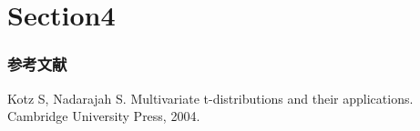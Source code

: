 \documentclass[dvipdfmx,11pt]{beamer}
\begin{document}
\section{Section4}
\begin{frame}[t,allowframebreaks]\frametitle{参考文献}
    \scriptsize{%
    \begin{thebibliography}{99}
    \setlength{\itemsep}{-.5zw}
    \beamertemplatetextbibitems
     Kotz S, Nadarajah S. Multivariate t-distributions and their applications. Cambridge University Press, 2004.
    \end{thebibliography}
    }
\end{frame}
\end{document}
